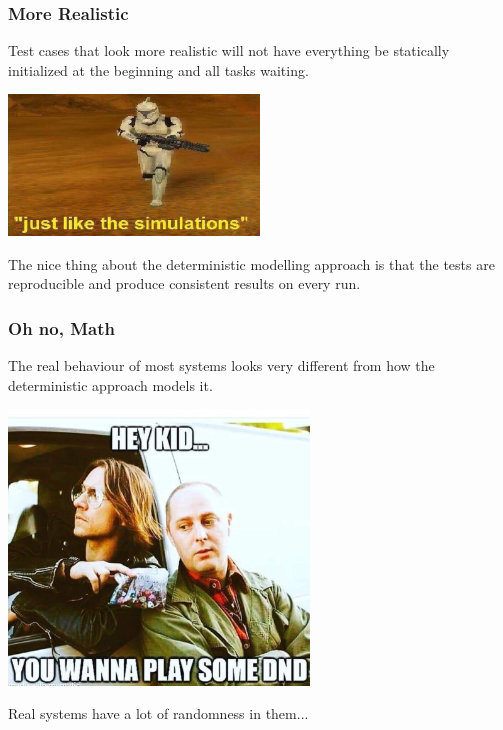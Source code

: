 \begin{frame}
\frametitle{More Realistic}

Test cases that look more realistic will not have everything be statically initialized at the beginning and all tasks waiting.

\begin{center}
	\includegraphics[width=0.5\textwidth]{images/simulations.jpg}
\end{center}

The nice thing about the deterministic modelling approach is that the tests are reproducible and produce consistent results on every run.

\end{frame}

\begin{frame}
\frametitle{Oh no, Math}

The real behaviour of most systems looks very different from how the deterministic approach models it.

\begin{center}
	\includegraphics[width=0.6\textwidth]{images/dnd.jpg}
\end{center}

Real systems have a lot of randomness in them...

\end{frame}

